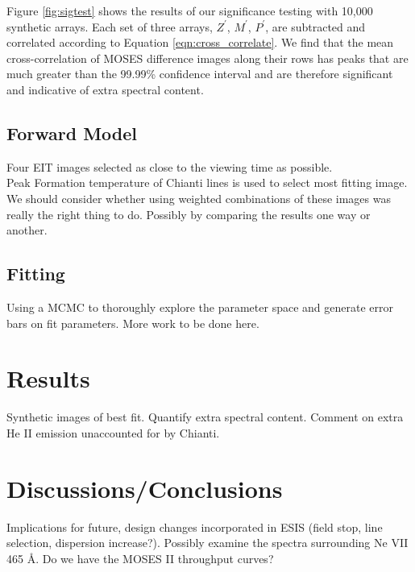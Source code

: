\documentclass[]{solarphysics}
\begin{document}
\begin{article}
	Figure \ref{fig:sigtest} shows the results of our significance testing with 10,000 synthetic arrays.  Each set of three arrays, $Z^{'}$, $M^{'}$, $P^{'}$, are subtracted and correlated according to Equation \ref{eqn:cross_correlate}. We find that the mean cross-correlation of MOSES difference images along their rows has peaks that are much greater than the 99.99\% confidence interval and are therefore significant and indicative of extra spectral content.
	
	
	
	
	
	\subsection{Forward Model} 
	Four EIT images selected as close to the viewing time as possible.  \\
	Peak Formation temperature of Chianti lines is used to select most fitting image.  We should consider whether using weighted combinations of these images was really the right thing to do. Possibly by comparing the results one way or another.
	\subsection{Fitting}
	Using a MCMC to thoroughly explore the parameter space and generate error bars on fit parameters. More work to be done here.

\section{Results}
	Synthetic images of best fit.  Quantify extra spectral content.  Comment on extra He II emission unaccounted for by Chianti. 

\section{Discussions/Conclusions}
	Implications for future, design changes incorporated in ESIS (field stop, line selection, dispersion increase?). Possibly examine the spectra surrounding Ne VII 465 \AA.  Do we have the MOSES II throughput curves? 
	



\end{article}
\end{document}
